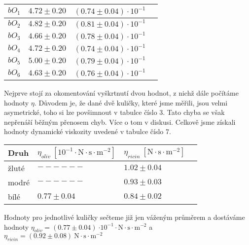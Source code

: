 \documentclass[a4paper]{article}
\begin{document}
\begin{center}
\begin{tabular}{ | l | l | l | p{3cm} |}
    $bO_{1}$      & $4.72\pm0.20$ & $(0.74\pm0.04) \cdot 10^{-1}$ \\ \hline
    $bO_{2}$      & $4.82\pm0.20$ & $(0.81\pm0.04) \cdot 10^{-1}$ \\ \hline
    $bO_{3}$      & $4.66\pm0.20$ & $(0.78\pm0.04) \cdot 10^{-1}$ \\ \hline
    $bO_{4}$      & $4.72\pm0.20$ & $(0.74\pm0.04) \cdot 10^{-1}$ \\ \hline
    $bO_{5}$      & $5.00\pm0.20$ & $(0.79\pm0.04) \cdot 10^{-1}$ \\ \hline
    $bO_{6}$      & $4.63\pm0.20$ & $(0.76\pm0.04) \cdot 10^{-1}$ \\ \hline
    \end{tabular}
\end{center}
\par Nejprve stojí za okomentování vyškrtnutí dvou hodnot, z nichž dále počítáme hodnoty $\eta$. Důvodem je, že dané dvě kuličky, které jsme měřili, jsou velmi asymetrické, toho si lze povšimnout v tabulce číslo 3. Tato chyba se však nepřenáší běžným přenosem chyb. Více o tom v diskusi. Celkově jsme získali hodnoty dynamické viskozity uvedené v tabulce číslo 7.
\newpage
\begin{center}
     \label{tab:title}
    \begin{tabular}{ | l | l | l | p{3cm} |} \hline
    Druh & $\eta_{oliv} \: \mathrm{[10^{-1} \cdot N \cdot s \cdot m^{-2}]}$  & $\eta_{ricin} \: \mathrm{[N \cdot s \cdot m^{-2}]}$ \\ \hline
    žluté & $------$ & $1.02\pm0.04$ \\ \hline
    modré & $------$ & $0.93\pm0.03$ \\ \hline
    bílé & $0.77\pm0.04$ & $0.84\pm0.02$ \\ \hline
    \end{tabular}
\end{center}
\par Hodnoty pro jednotlivé kuličky sečteme již jen váženým průměrem a dostáváme hodnoty $\eta_{oliv} = (0.77\pm0.04)  \: \mathrm{\cdot 10^{-1} \cdot N \cdot s \cdot m^{-2}}$ a $\eta_{ricin} = (0.92\pm0.08)  \: \mathrm{N \cdot s \cdot m^{-2}}$
\end{document}

